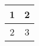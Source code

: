 \begin{table}
\begin{center}
\begin{tabular}{|c|c|}
\hline
1 & 2 \\
\hline
2 & 3 \\
\hline
\end{tabular}
\caption{}
\label{}
\end{center}
\end{table}
